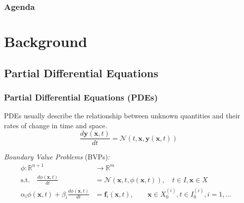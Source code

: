 \documentclass[t]{beamer}
\newcommand{\R}{\mathbb{R}}
\begin{document}

% 


\begin{frame}
\frametitle{Agenda}
\tableofcontents
\end{frame}

\section{Background}

\subsection{Partial Differential Equations}

\begin{frame}
    \frametitle{Partial Differential Equations (PDEs)}
    PDEs usually describe the relationship between unknown quantities and their rates of change in time and space.
    \begin{equation}
	\frac{d \bm{y}\left( \bm{x}, t \right) }{d t} = \mathcal{N}\left( t, \bm{x}, \bm{y}\left( \bm{x},t \right)  \right) 
    \end{equation}\pause

    \emph{Boundary Value Problems} (BVPs):
    \begin{align*}
	\phi :\R^{n+1}&\to \R^{m} &\\
	\text{s.t.} \quad \frac{d \phi\left( \bm{x},t \right) }{d t} &= \mathcal{N}\left( \bm{x},t, \phi\left( \bm{x},t \right)  \right), \quad t\in I, \bm{x}\in X \\
	\alpha_i\phi\left( \bm{x},t \right) + \beta_i \frac{d \phi\left( \bm{x},t \right) }{d t} &= \bm{f}_i\left( \bm{x},t \right), \quad\quad\bm{x}\in X_0^{(i)}, t\in I_0^{(i)}, i=1,\ldots
    \end{align*}
\end{frame}
\end{document}
